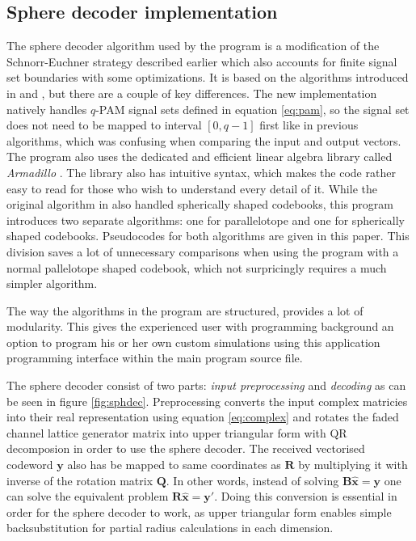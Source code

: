 \documentclass[english,12pt,a4paper,pdftex,sci,utf8]{aaltothesis}
\begin{document}
\subsection{Sphere decoder implementation}
The sphere decoder algorithm used by the program is a modification of the Schnorr-Euchner strategy described earlier which also accounts for finite signal set boundaries with some optimizations. It is based on the algorithms introduced in \cite{mia} and \cite{ranto}, but there are a couple of key differences. The new implementation natively handles $q$-PAM signal sets defined in equation \eqref{eq:pam}, so the signal set does not need to be mapped to interval $[0,q-1]$ first like in previous algorithms, which was confusing when comparing the input and output vectors. The program also uses the dedicated and efficient linear algebra library called \emph{Armadillo} \cite{arma}. The library also has intuitive syntax, which makes the code rather easy to read for those who wish to understand every detail of it. While the original algorithm in \cite{ranto} also handled spherically shaped codebooks, this program introduces two separate algorithms: one for parallelotope and one for spherically shaped codebooks. Pseudocodes for both algorithms are given in this paper. This division saves a lot of unnecessary comparisons when using the program with a normal pallelotope shaped codebook, which not surpricingly requires a much simpler algorithm. 
\par The way the algorithms in the program are structured, provides a lot of modularity. This gives the experienced user with programming background an option to program his or her own custom simulations using this application programming interface within the main program source file.
\par The sphere decoder consist of two parts: \emph{input preprocessing} and \emph{decoding} as can be seen in figure \ref{fig:sphdec}. Preprocessing converts the input complex matricies into their real representation using equation \eqref{eq:complex} and rotates the faded channel lattice generator matrix into upper triangular form with QR decomposion in order to use the sphere decoder. The received vectorised codeword $\textbf{y}$ also has be mapped to same coordinates as $\textbf{R}$ by multiplying it with inverse of the rotation matrix $\textbf{Q}$. In other words, instead of solving $\mathbf{B\hat{x}}=\mathbf{y}$ one can solve the equivalent problem $\mathbf{R\hat{x}}=\mathbf{y'}$. Doing this conversion is essential in order for the sphere decoder to work, as upper triangular form enables simple backsubstitution for partial radius calculations in each dimension. 
\end{document}
